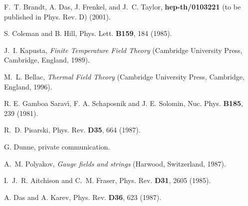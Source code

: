 \documentclass[a4paper,12pt]{article}
\begin{document}
\begin{thebibliography}{10}
F.~T. Brandt, A. Das, J. Frenkel, and J.~C. Taylor, 
{\bf hep-th/0103221}  (to be published in Phys. Rev. D) (2001).

S. Coleman and B. Hill, Phys. Lett. {\bf B159},  184  (1985).

J.~I. Kapusta, {\em Finite Temperature Field Theory} (Cambridge University
  Press, Cambridge, England, 1989).

M.~L. Bellac, {\em Thermal Field Theory} (Cambridge University Press,
  Cambridge, England, 1996).

R. E. Gamboa Sarav\'{\i}, F. A. Schaposnik and J. E. Solomin,
Nuc. Phys. {\bf B185}, 239 (1981).

R.~D. Pisarski, Phys. Rev. {\bf D35},  664  (1987).

G. Dunne, private communication.

A.~M. Polyakov, {\em Gauge fields and strings} (Harwood, Switzerland, 1987).

I.~J.~R. Aitchison and C.~M. Fraser, Phys. Rev. {\bf D31},  2605  (1985).

A. Das and A. Karev, Phys. Rev. {\bf D36},  623  (1987).

\end{thebibliography}
\end{document}
